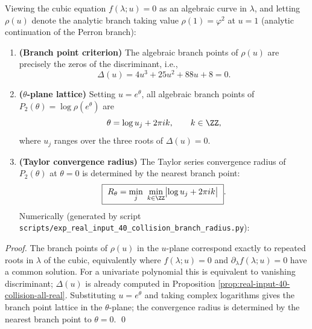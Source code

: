 \begin{corollary}[Complex Branch Points and Analytic Radius at \texorpdfstring{$\theta=0$}{theta=0}]\label{cor:real-input-40-collision-branch-radius}
Viewing the cubic equation \(f(\lambda;u)=0\) as an algebraic curve in \(\lambda\), and letting \(\rho(u)\) denote the analytic branch taking value \(\rho(1)=\varphi^2\) at \(u=1\) (analytic continuation of the Perron branch):
\begin{enumerate}
  \item \textbf{(Branch point criterion)} The algebraic branch points of \(\rho(u)\) are precisely the zeros of the discriminant, i.e.,
  \[
  \Delta(u)=4u^3+25u^2+88u+8=0.
  \]
  \item \textbf{(\(\theta\)-plane lattice)} Setting \(u=e^\theta\), all algebraic branch points of \(P_2(\theta)=\log\rho(e^\theta)\) are
  \[
  \theta=\log u_j+2\pi i k,\qquad k\in\ZZ,
  \]
  where \(u_j\) ranges over the three roots of \(\Delta(u)=0\).
  \item \textbf{(Taylor convergence radius)} The Taylor series convergence radius of \(P_2(\theta)\) at \(\theta=0\) is determined by the nearest branch point:
  \[
  \boxed{\ R_\theta=\min_{j}\ \min_{k\in\ZZ}\bigl|\log u_j+2\pi i k\bigr|\ }.
  \]
  Numerically (generated by script \texttt{scripts/exp\_real\_input\_40\_collision\_branch\_radius.py}):
  
\end{enumerate}
\end{corollary}
\begin{proof}
The branch points of \(\rho(u)\) in the \(u\)-plane correspond exactly to repeated roots in \(\lambda\) of the cubic, equivalently where
\(
f(\lambda;u)=0
\)
and
\(
\partial_\lambda f(\lambda;u)=0
\)
have a common solution.
For a univariate polynomial this is equivalent to vanishing discriminant; \(\Delta(u)\) is already computed in Proposition \ref{prop:real-input-40-collision-all-real}.
Substituting \(u=e^\theta\) and taking complex logarithms gives the branch point lattice in the \(\theta\)-plane; the convergence radius is determined by the nearest branch point to \(\theta=0\). \qed
\end{proof}

